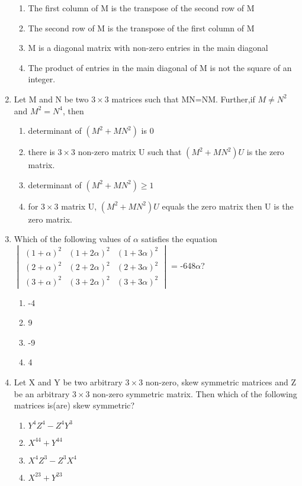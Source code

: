 \begin{enumerate}[label=\arabic*.,ref=\thesubsection.\theenumi]
\begin{enumerate}
 \item The first column of M is the transpose of the second row of M
 \item The second row of M is the transpose of the first column of M
 \item M is a diagonal matrix with non-zero entries in the main diagonal
 \item The product of entries in the main diagonal of M is not the square of an integer. \end{enumerate}
\item Let M and N be two $3\times 3$ matrices such that MN=NM. Further,if $M\neq N^2$ and  $M^2=N^4$, then
\begin{enumerate}
 \item determinant of $(M^2+MN^2)$ is 0
 \item there is $3\times3$ non-zero matrix U such that  $(M^2+MN^2)U$ is the zero matrix.
 \item determinant of  $(M^2+MN^2)\geq1$
 \item for $3\times3$ matrix U, $(M^2+MN^2)U$ equals the zero matrix then U is the zero matrix. 
 \end{enumerate}
 \item Which of the following values of $\alpha$ satisfies the equation $\begin{vmatrix} (1+\alpha)^2 & (1+2\alpha)^2 &(1+3\alpha)^2  \\ (2+\alpha)^2 & (2+2\alpha)^2 & (2+3\alpha)^2 \\(3+\alpha)^2 & (3+2\alpha)^2 & (3+3\alpha)^2 \end{vmatrix}$ = -648$\alpha$?
 \begin{enumerate}
 \item -4
 \item  9
 \item -9
 \item  4
\end{enumerate}
\item Let X and Y be two arbitrary $3\times3$ non-zero, skew symmetric matrices and Z be an arbitrary $3\times3$ non-zero symmetric matrix. Then which of the following matrices is(are) skew symmetric?
\begin{enumerate}
 \item $Y^4Z^4-Z^4Y^3$
 \item $X^{44}+Y^{44}$
 \item $X^4Z^3-Z^3X^4$ 
 \item $X^{23}+Y^{23}$
 \end{enumerate}

\end{enumerate}
